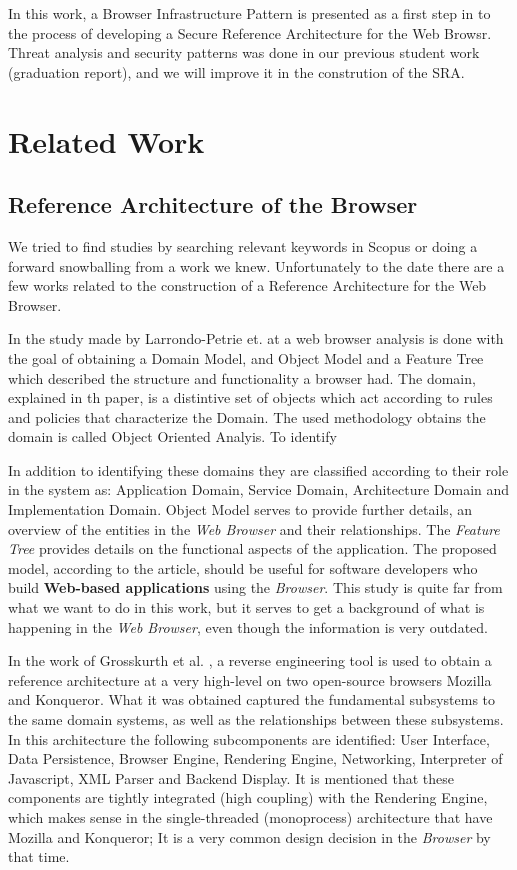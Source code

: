 \documentclass{sig-alternate-05-2015}
\begin{document}
In this work, a Browser Infrastructure Pattern is presented as a first step in to the process of developing a Secure Reference Architecture for the Web Browsr. Threat analysis and security patterns was done in our previous student work (graduation report), and we will improve it in the constrution of the SRA.

\section*{Related Work}
  \subsection*{Reference Architecture of the Browser}
  We tried to find studies by searching relevant keywords in Scopus or doing a forward snowballing from a work \cite{2005-grosskurth-browser-refarch} we knew. Unfortunately to the date there are a few works related to the construction of a Reference Architecture for the Web Browser.

  In the study made by Larrondo-Petrie et. at \cite{535061} a web browser analysis is done with the goal of obtaining a Domain Model, and Object Model and a Feature Tree which described the structure and functionality a browser had. The domain, explained in th paper, is a distintive set of objects which act according to rules and policies that characterize the Domain. The used methodology obtains the domain is called Object Oriented Analyis. To identify

  In addition to identifying these domains they are classified according to their role in the system as: Application Domain, Service Domain, Architecture Domain and Implementation Domain. Object Model serves to provide further details, an overview of the entities in the \textit{Web Browser} and their relationships. The \textit{Feature Tree} provides details on the functional aspects of the application. The proposed model, according to the article, should be useful for software developers who build \textbf{Web-based applications} using the \textit{Browser}. This study is quite far from what we want to do in this work, but it serves to get a background of what is happening in the \textit{Web Browser}, even though the information is very outdated.

  In the work of Grosskurth et al. \cite{2005-grosskurth-browser-refarch,preprint-Grosskurth-browser-archevol}, a reverse engineering tool is used to obtain a reference architecture at a very high-level on two open-source browsers Mozilla and Konqueror. What it was obtained captured the fundamental subsystems to the same domain systems, as well as the relationships between these subsystems. In this architecture the following subcomponents are identified: User Interface, Data Persistence, Browser Engine, Rendering Engine, Networking, Interpreter of Javascript, XML Parser and Backend Display. It is mentioned that these components are tightly integrated (high coupling) with the Rendering Engine, which makes sense in the single-threaded (monoprocess) architecture that have Mozilla and Konqueror; It is a very common design decision in the \textit{Browser} by that time. 
\end{document}
